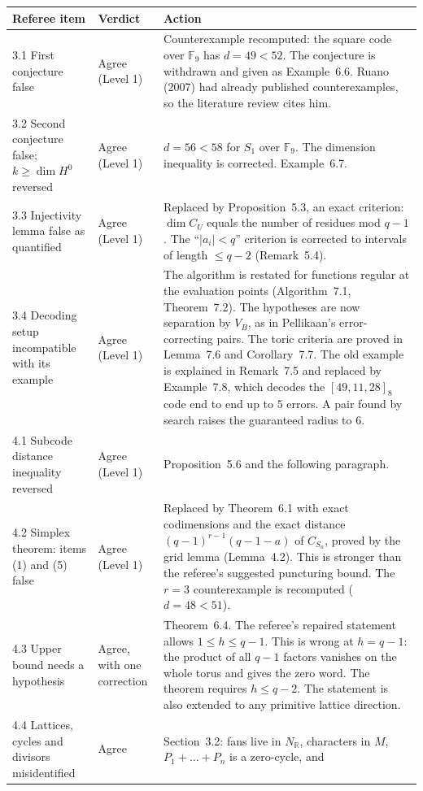 \documentclass[12pt,letterpaper]{article}
\newcommand{\F}{\mathbb{F}}
\newcommand{\R}{\mathbb{R}}
\begin{document}
\begin{longtable}{@{}L{0.27\textwidth}L{0.19\textwidth}L{0.46\textwidth}@{}}
\toprule
Referee item & Verdict & Action\\ \midrule
{} First conjecture false & Agree (Level 1) & Counterexample recomputed: the
square code over $\F_9$ has $d=49<52$. The conjecture is withdrawn and given as
Example~6.6. Ruano (2007) had already published counterexamples, so the
literature review cites him.\\
3.2 Second conjecture false; $k\ge\dim H^0$ reversed & Agree (Level 1) & $d=56<58$
for $S_1$ over $\F_9$. The dimension inequality is corrected. Example~6.7.\\
3.3 Injectivity lemma false as quantified & Agree (Level 1) & Replaced by
Proposition~5.3, an exact criterion: $\dim C_U$ equals the number of residues
mod $q-1$. The ``$|a_i|<q$'' criterion is corrected to intervals of length
$\le q-2$ (Remark~5.4).\\
3.4 Decoding setup incompatible with its example & Agree (Level 1) & The
algorithm is restated for functions regular at the evaluation points
(Algorithm~7.1, Theorem~7.2). The hypotheses are now separation by $V_B$, as
in Pellikaan's error-correcting pairs. The toric criteria are proved in
Lemma~7.6 and Corollary~7.7. The old example is explained in Remark~7.5 and
replaced by Example~7.8, which decodes the $[49,11,28]_8$ code end to end
up to $5$ errors. A pair found by search raises the guaranteed radius to $6$.\\
4.1 Subcode distance inequality reversed & Agree (Level 1) &
Proposition~5.6 and the following paragraph.\\
4.2 Simplex theorem: items (1) and (5) false & Agree (Level 1) & Replaced by
Theorem~6.1 with exact codimensions and the exact distance
$(q-1)^{r-1}(q-1-a)$ of $C_{S_a}$, proved by the grid lemma (Lemma~4.2). This
is stronger than the referee's suggested puncturing bound. The $r=3$
counterexample is recomputed ($d=48<51$).\\
4.3 Upper bound needs a hypothesis & Agree, with one correction & Theorem~6.4.
The referee's repaired statement allows $1\le h\le q-1$. This is wrong at
$h=q-1$: the product of all $q-1$ factors vanishes on the whole torus and
gives the zero word. The theorem requires $h\le q-2$. The statement is also
extended to any primitive lattice direction.\\
4.4 Lattices, cycles and divisors misidentified & Agree & Section~3.2:
fans live in $N_\R$, characters in $M$, $P_1+\dots+P_n$ is a zero-cycle, and

\end{longtable}
\end{document}
